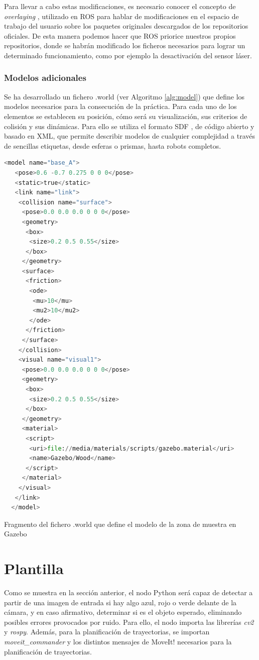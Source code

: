 \documentclass[12pt,spanish,chapterprefix, numbers=noenddot]{book}
\numberwithin{equation}{section}
\numberwithin{figure}{section}
\begin{document}
Para llevar a cabo estas modificaciones, es necesario conocer el concepto de \textit{overlaying} \cite{overlaying}, utilizado en ROS para hablar de modificaciones en el espacio de trabajo \cite{wstool} del usuario sobre los paquetes originales descargados de los repositorios oficiales. De esta manera podemos hacer que ROS priorice nuestros propios repositorios, donde se habrán modificado los ficheros necesarios para lograr un determinado funcionamiento, como por ejemplo la desactivación del sensor láser.

\subsubsection{Modelos adicionales}
Se ha desarrollado un fichero .world (ver Algoritmo \ref{alg:model}) que define los modelos necesarios para la consecución de la práctica. Para cada uno de los elementos se establecen su posición, cómo será su visualización, sus criterios de colisión y sus dinámicas. 
Para ello se utiliza el formato SDF \cite{sdf_format}, de código abierto y basado en XML, que permite describir modelos de cualquier complejidad a través de sencillas etiquetas, desde esferas o prismas, hasta robots completos.

\vspace{20pt}
\begin{algorithm}[htb!]
	\begin{lstlisting}[breaklines=true,language=python]  
  <model name="base_A">
   <pose>0.6 -0.7 0.275 0 0 0</pose>
   <static>true</static>
   <link name="link">
    <collision name="surface">
     <pose>0.0 0.0 0.0 0 0 0</pose>
     <geometry>
      <box>
       <size>0.2 0.5 0.55</size>
      </box>
     </geometry>
     <surface>
      <friction>
       <ode>
        <mu>10</mu>
        <mu2>10</mu2>
       </ode>
      </friction>
     </surface>
    </collision>
    <visual name="visual1">
     <pose>0.0 0.0 0.0 0 0 0</pose>
     <geometry>
      <box>
       <size>0.2 0.5 0.55</size>
      </box>
     </geometry>
     <material>
      <script>
       <uri>file://media/materials/scripts/gazebo.material</uri>
       <name>Gazebo/Wood</name>
      </script>
     </material>
    </visual>
   </link>
  </model>
	\end{lstlisting}
\caption{\label{alg:model}Fragmento del fichero .world que define el modelo de la zona de muestra en Gazebo}
\end{algorithm}

\section{Plantilla}\label{sec:plantilla}
Como se muestra en la sección anterior, el nodo Python será capaz de detectar a partir de una imagen de entrada si hay algo azul, rojo o verde delante de la cámara, y en caso afirmativo, determinar si es el objeto esperado, eliminando posibles errores provocados por ruido. 
Para ello, el nodo importa las librerías \textit{cv2} y \textit{rospy}. Además, para la planificación de trayectorias, se importan \textit{moveit\_commander} y los distintos mensajes de MoveIt! necesarios para la planificación de trayectorias.
\end{document}
